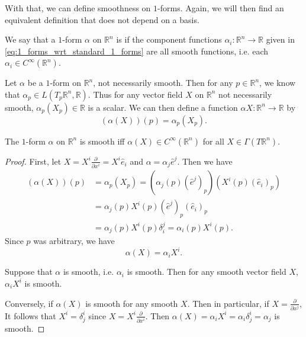 \documentclass[notoc,notitlepage]{tufte-book}
\begin{document}
With that, we can define smoothness on $1$-forms. Again, we will then find an equivalent definition
that does not depend on a basis.

\begin{defn}\label{defn:smooth_1_forms}
  We say that a $1$-form $\alpha$ on $\mathbb{R}^n$ is  if the component functions
  $\alpha_i : \mathbb{R}^n \to \mathbb{R}$ given in \cref{eq:1_forms_wrt_standard_1_forms} are all
  smooth functions, i.e. each $\alpha_i \in C^\infty(\mathbb{R}^n)$.
\end{defn}

Let $\alpha$ be a $1$-form on $\mathbb{R}^n$, not necessarily smooth. Then for any $p \in
\mathbb{R}^n$, we know that $\alpha_p \in L(T_p \mathbb{R}^n, \mathbb{R})$. Thus for any vector
field $X$ on $\mathbb{R}^n$ not necessarily smooth, $\alpha_p (X_p) \in \mathbb{R}$ is a scalar.
We can then define a function $\alpha X : \mathbb{R}^n \to \mathbb{R}$ by
\begin{equation}\label{eq:1_form_on_vector_fields_get_scalar}
  (\alpha(X))(p) = \alpha_p(X_p).
\end{equation}

\begin{propo}\label{propo:equivalent_definition_for_smoothness_of_1_forms}
  The $1$-form $\alpha$ on $\mathbb{R}^n$ is smooth iff $\alpha(X) \in C^\infty(\mathbb{R}^n)$
  for all $X \in \Gamma(T \mathbb{R}^n)$.
\end{propo}

\begin{proof}
  First, let $X = X^i \frac{\partial}{\partial x^i} = X^i \hat{e}_i$ and $\alpha =
  \alpha_j \hat{e}^j$. Then we have
  \begin{align*}
    (\alpha(X))(p) &= \alpha_p(X_p) = (\alpha_j(p)(\hat{e}^j)_p)(X^i(p)(\hat{e}_i)_p) \\
                   &= \alpha_j(p)X^i(p)(\hat{e}^j)_p(\hat{e}_i)_p \\
                   &= \alpha_j(p)X^i(p) \delta_i^j = \alpha_i(p) X^i(p).
  \end{align*}
  Since $p$ was arbitrary, we have
  \begin{equation}\label{eq:1_form_on_vector_fields_get_scalar_as_a_sum}
    \alpha(X) = \alpha_i X^i.
  \end{equation}

  Suppose that $\alpha$ is smooth, i.e. $\alpha_i$ is smooth. Then for any smooth vector field
  $X$, $\alpha_i X^i$ is smooth.

  Conversely, if $\alpha(X)$ is smooth for any smooth $X$. Then in particular, if $X
  = \frac{\partial}{\partial x^j}$, It follows that $X^i = \delta_j^i$ since $X = X^i
  \frac{\partial}{\partial x^i}$. Then $\alpha(X) = \alpha_i X^i = \alpha_i \delta_j^i =
  \alpha_j$ is smooth.
\end{proof}
\end{document}
